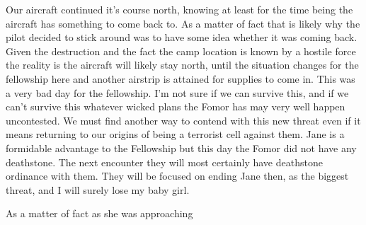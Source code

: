 Our aircraft continued it's course north, knowing at least for the time being the aircraft has something to come back to. As a matter of fact that is likely why the pilot decided to stick around was to have some idea whether it was coming back. Given the destruction and the fact the camp location is known by a hostile force the reality is the aircraft will likely stay north, until the situation changes for the fellowship here and another airstrip is attained for supplies to come in. This was a very bad day for the fellowship. I'm not sure if we can survive this, and if we can't survive this whatever wicked plans the Fomor has may very well happen uncontested. We must find another way to contend with this new threat even if it means returning to our origins of being a terrorist cell against them. Jane is a formidable advantage to the Fellowship but this day the Fomor did not have any deathstone. The next encounter they will most certainly have deathstone ordinance with them. They will be focused on ending Jane then, as the biggest threat, and I will surely lose my baby girl.

As a matter of fact as she was approaching


 
